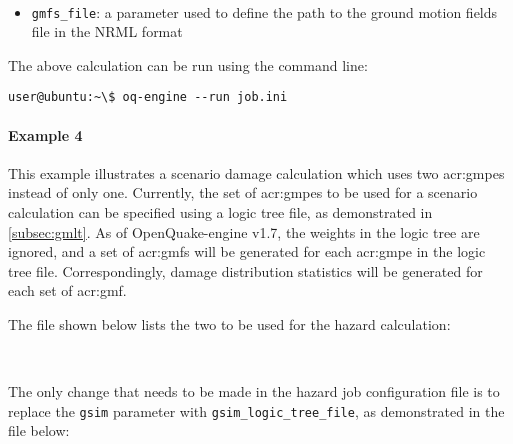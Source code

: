 \inputminted[firstline=1,firstnumber=1,fontsize=\footnotesize,frame=single,linenos,bgcolor=lightgray,label=job.ini]{ini}{oqum/risk/verbatim/config_scenario_damage_gmf.ini}\\

\begin{itemize}

  \item \Verb+gmfs_file+: a parameter used to define the path
	  to the ground motion fields file in the NRML format

\end{itemize}

The above calculation can be run using the command line:

\begin{Verbatim}[frame=single, commandchars=\\\{\}, samepage=true]
user@ubuntu:~\$ oq-engine --run job.ini
\end{Verbatim}


\paragraph{Example 4}

This example illustrates a scenario damage calculation which uses two
\glspl{acr:gmpe} instead of only one. Currently, the set of \glspl{acr:gmpe}
to be used for a scenario calculation can be specified using a logic tree
file, as demonstrated in \ref{subsec:gmlt}. As of OpenQuake-engine v1.7, the
weights in the logic tree are ignored, and a set of \glspl{acr:gmf} will be
generated for each \gls{acr:gmpe} in the logic tree file. Correspondingly,
damage distribution statistics will be generated for each set of
\gls{acr:gmf}.

The file shown below lists the two  to be used for the hazard
calculation:

\inputminted[firstline=1,firstnumber=1,fontsize=\footnotesize,frame=single,linenos,bgcolor=lightgray,label=gsim\_logic\_tree.xml]{xml}{oqum/risk/verbatim/input_scenario_gmlt.xml}\\

The only change that needs to be made in the hazard job configuration file is
to replace the \Verb+gsim+ parameter with \Verb+gsim_logic_tree_file+, as
demonstrated in the file below:

\inputminted[firstline=1,firstnumber=1,fontsize=\footnotesize,frame=single,linenos,bgcolor=lightgray,label=job\_hazard.ini]{ini}{oqum/risk/verbatim/config_scenario_hazard_gmlt.ini}\\

